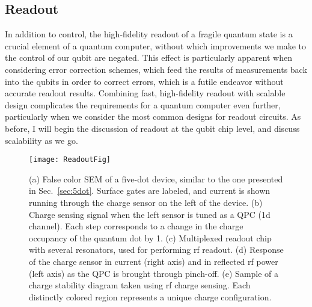 \subsection{Readout}
\label{sec:readout}
In addition to control, the high-fidelity readout of a fragile quantum state is a crucial element of a quantum computer, without which improvements
we make to the control of our qubit are negated. This effect is particularly apparent when considering error correction schemes, which feed the results
of measurements back into the qubits in order to correct errors, which is a futile endeavor without accurate readout results. Combining fast,
high-fidelity readout with scalable design complicates the requirements for a quantum computer even further, particularly when we consider
the most common designs for readout circuits. As before, I will begin the discussion of readout at the qubit chip level, and discuss scalability as we go.

\begin{figure}
  \texttt{[image: ReadoutFig]}
  \caption[Readout of a semiconductor quantum dot]
  {\label{fig:readout}(a) False color SEM of a five-dot device, similar to the one presented in Sec.~\ref{sec:5dot}. Surface gates are labeled, and
  current is shown running through the charge sensor on the left of the device. (b) Charge sensing signal when the left sensor is tuned as a QPC (1d channel).
  Each step corresponds to a change in the charge occupancy of the quantum dot by 1. (c) Multiplexed readout chip with several resonators, used for
  performing rf readout. (d) Response of the charge sensor in current (right axis) and in reflected rf power (left axis) as the QPC is brought through pinch-off.
  (e) Sample of a charge stability diagram taken using rf charge sensing. Each distinctly colored region represents a unique charge configuration.}
\end{figure}

